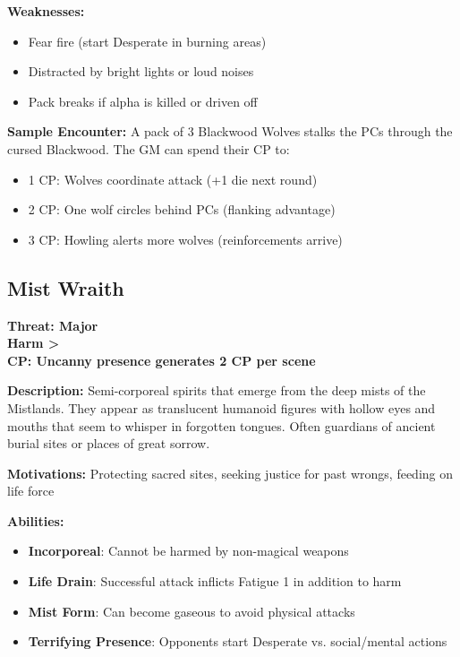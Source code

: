 \documentclass[12pt]{article}
\newcommand{\cp}[1]{\textbf{CP: #1}}
\newcommand{\harm}[1]{\textbf{Harm #1}}
\newcommand{\threat}[1]{\textbf{Threat: #1}}
\begin{document}
\textbf{Weaknesses:} 
\begin{itemize}
\item Fear fire (start Desperate in burning areas)
\item Distracted by bright lights or loud noises
\item Pack breaks if alpha is killed or driven off
\end{itemize}

\textbf{Sample Encounter:}
A pack of 3 Blackwood Wolves stalks the PCs through the cursed Blackwood. The GM can spend their CP to:
\begin{itemize}
\item 1 CP: Wolves coordinate attack (+1 die next round)
\item 2 CP: One wolf circles behind PCs (flanking advantage)
\item 3 CP: Howling alerts more wolves (reinforcements arrive)
\end{itemize}

\subsection*{Mist Wraith}

\threat{Major} \\
\harm{>} \\
\cp{Uncanny presence generates 2 CP per scene}

\vspace{0.5em}
\textbf{Description:} Semi-corporeal spirits that emerge from the deep mists of the Mistlands. They appear as translucent humanoid figures with hollow eyes and mouths that seem to whisper in forgotten tongues. Often guardians of ancient burial sites or places of great sorrow.

\textbf{Motivations:} Protecting sacred sites, seeking justice for past wrongs, feeding on life force

\textbf{Abilities:}
\begin{itemize}
\item \textbf{Incorporeal}: Cannot be harmed by non-magical weapons
\item \textbf{Life Drain}: Successful attack inflicts Fatigue 1 in addition to harm
\item \textbf{Mist Form}: Can become gaseous to avoid physical attacks
\item \textbf{Terrifying Presence}: Opponents start Desperate vs. social/mental actions
\end{itemize}
\end{document}
